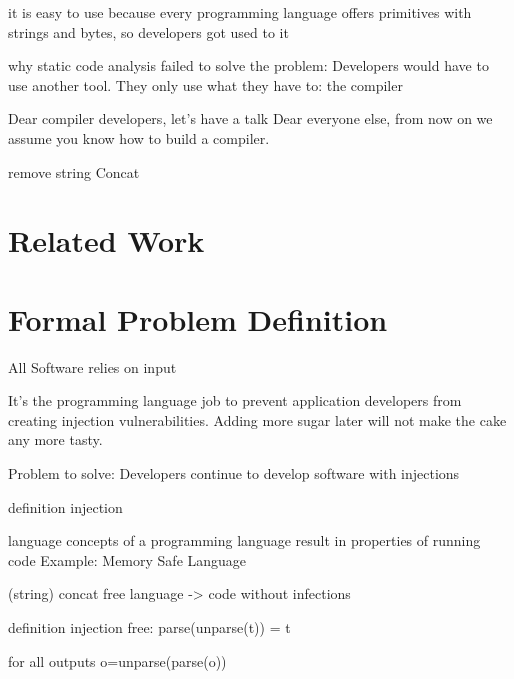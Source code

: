\documentclass[conference]{IEEEtran}
\newcommand{\punchline}[1]{\textbf{Punch line: #1}}
\renewcommand{\punchline}[1]{}
\begin{document}
\punchline{Why do developers use it}
it is easy to use because every programming language offers primitives with strings and bytes, so developers got used to it

\punchline{Related approaches}
why static code analysis failed to solve the problem: Developers would have to use another tool. They only use what they have to: the compiler

Dear compiler developers, let's have a talk
Dear everyone else, from now on we assume you know how to build a compiler.

\punchline{building SAST into compilers will not solve the problem}
\cite{rice}

\punchline{redesign the language}
remove string Concat

\punchline{the solution has to be as easy as string concatenation}

\punchline{summarize solution from both perspectives}



\section{Related Work}\label{sec:relwork}
\punchline{Lars bashing, how could you assume that developers will use your tool/library}


\section{Formal Problem Definition} \label{sec:problem}


All Software relies on input


It's the programming language job to prevent application developers from creating injection vulnerabilities.
Adding more sugar later will not make the cake any more tasty.


Problem to solve: Developers continue to develop software with injections

definition injection

language concepts of a programming language result in properties of running code
Example: Memory Safe Language

\punchline{define input safe language}
(string) concat free language -> code without infections

definition injection free: parse(unparse(t)) = t

for all outputs o=unparse(parse(o))
\end{document}
